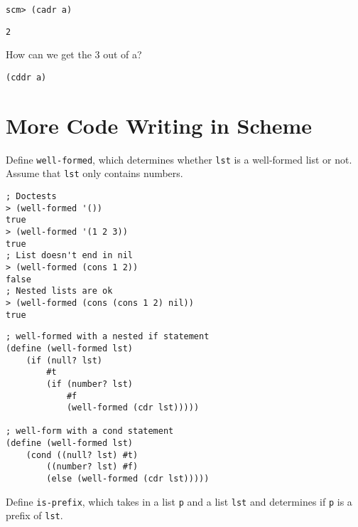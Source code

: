 \documentclass{exam}
\begin{document}
\begin{questions}
\begin{blocksection}
\begin{lstlisting}
scm> (cadr a)
\end{lstlisting}
\begin{solution}[.25in]
\begin{lstlisting}
2
\end{lstlisting}
\end{solution}

How can we get the 3 out of a?
\begin{solution}[.25in]
\begin{lstlisting}
(cddr a)
\end{lstlisting}
\end{solution}
\end{blocksection}

\section{More Code Writing in Scheme}

\begin{blocksection}
\question Define \texttt{well-formed}, which determines whether \texttt{lst} is a well-formed list or not. Assume that \texttt{lst} only contains numbers.

\begin{lstlisting}
; Doctests
> (well-formed '())
true
> (well-formed '(1 2 3))
true
; List doesn't end in nil
> (well-formed (cons 1 2))
false
; Nested lists are ok
> (well-formed (cons (cons 1 2) nil))
true
\end{lstlisting}

\begin{solution}[0.75in]
\begin{lstlisting}
; well-formed with a nested if statement
(define (well-formed lst)
    (if (null? lst)
        #t
        (if (number? lst)
            #f
            (well-formed (cdr lst)))))

; well-form with a cond statement
(define (well-formed lst)
    (cond ((null? lst) #t)
        ((number? lst) #f)
        (else (well-formed (cdr lst)))))
\end{lstlisting}
\end{solution}
\end{blocksection}

\begin{blocksection}
\question Define \texttt{is-prefix}, which takes in a list \texttt{p} and a list \texttt{lst} and determines if \texttt{p} is a prefix of \texttt{lst}.


\end{blocksection}
\end{questions}
\end{document}
